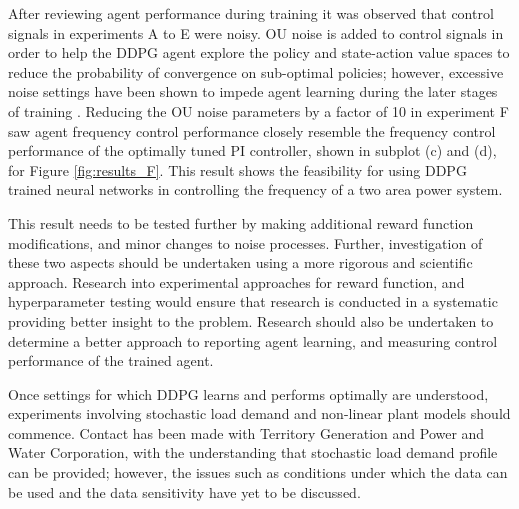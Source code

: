 After reviewing agent performance during training it was observed that control signals in experiments A to E were noisy. OU noise is added to control signals in order to help the DDPG agent explore the policy and state-action value spaces to reduce the probability of convergence on sub-optimal policies; however, excessive noise settings have been shown to impede agent learning during the later stages of training \cite{}. Reducing the OU noise parameters by a factor of 10 in experiment F saw agent frequency control performance closely resemble the frequency control performance of the optimally tuned PI controller, shown in subplot (c) and (d), for Figure \ref{fig:results_F}. This result shows the feasibility for using DDPG trained neural networks in controlling the frequency of a two area power system.

This result needs to be tested further by making additional reward function modifications, and minor changes to noise processes. Further, investigation of these two aspects should be undertaken using a more rigorous and scientific approach. Research into experimental approaches for reward function, and hyperparameter testing would ensure that research is conducted in a systematic providing better insight to the problem. Research should also be undertaken to determine a better approach to reporting agent learning, and measuring control performance of the trained agent.

Once settings for which DDPG learns and performs optimally are understood, experiments involving stochastic load demand and non-linear plant models should commence. Contact has been made with Territory Generation and Power and Water Corporation, with the understanding that stochastic load demand profile can be provided; however, the issues such as conditions under which the data can be used and the data sensitivity have yet to be discussed.
